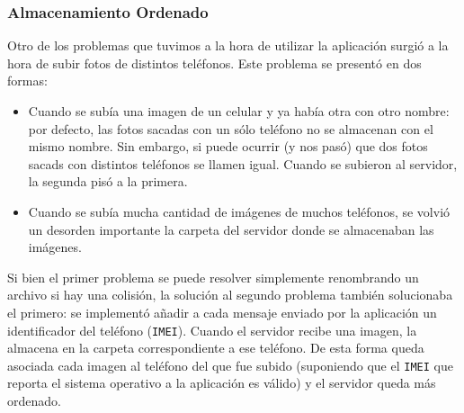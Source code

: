 \documentclass[10pt, a4paper,english,spanish]{article}
\begin{document}
\subsubsection{Almacenamiento Ordenado} %
\label{ssub:almacenamiento_ordenado}

Otro de los problemas que tuvimos a la hora de utilizar la aplicación surgió a la hora de subir fotos de distintos teléfonos. Este problema se presentó en dos formas:
\begin{itemize}
	\item Cuando se subía una imagen de un celular y ya había otra con otro nombre: por defecto, las fotos sacadas con un sólo teléfono no se almacenan con el mismo nombre. Sin embargo, si puede ocurrir (y nos pasó) que dos fotos sacads con distintos teléfonos se llamen igual. Cuando se subieron al servidor, la segunda pisó a la primera.
	\item Cuando se subía mucha cantidad de imágenes de muchos teléfonos, se volvió un desorden importante la carpeta del servidor donde se almacenaban las imágenes.
\end{itemize}

Si bien el primer problema se puede resolver simplemente renombrando un archivo si hay una colisión, la solución al segundo problema también solucionaba el primero: se implementó añadir a cada mensaje enviado por la aplicación un identificador del teléfono (\texttt{IMEI}). Cuando el servidor recibe una imagen, la almacena en la carpeta correspondiente a ese teléfono. De esta forma queda asociada cada imagen al teléfono del que fue subido (suponiendo que el \texttt{IMEI} que reporta el sistema operativo a la aplicación es válido) y el servidor queda más ordenado.






\end{document}
